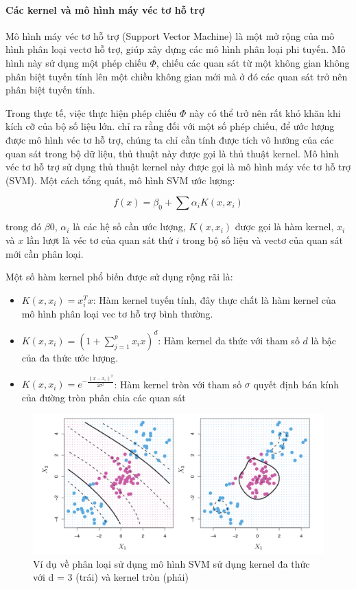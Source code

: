 \paragraph{Các kernel và mô hình máy véc tơ hỗ trợ}

Mô hình máy véc tơ hỗ trợ (Support Vector Machine) là một mở rộng của mô hình phân loại vectơ hỗ trợ, giúp xây dựng các mô hình phân loại phi tuyến. Mô hình này sử dụng một phép chiếu $\Phi$, chiếu các quan sát từ một không gian không phân biệt tuyến tính lên một chiều không gian mới mà ở đó các quan sát trở nên phân biệt tuyến tính.

Trong thực tế, việc thực hiện phép chiếu $\Phi$ này có thể trở nên rất khó khăn khi kích cỡ của bộ số liệu lớn. \textcite{scholkopf1999advances} chỉ ra rằng đối với một số phép chiếu, để ước lượng được mô hình véc tơ hỗ trợ, chúng ta chỉ cần tính được tích vô hướng của các quan sát trong bộ dữ liệu, thủ thuật này được gọi là thủ thuật kernel. Mô hình véc tơ hỗ trợ sử dụng thủ thuật kernel này được gọi là mô hình máy véc tơ hỗ trợ (SVM). Một cách tổng quát, mô hình SVM ước lượng:

$$
f(x) = \beta_0 + \sum\alpha_i K(x, x_i)
$$

trong đó $\beta0$, $\alpha_i$ là các hệ số cần ước lượng, $K(x, x_i)$ được gọi là hàm kernel, $x_i$ và $x$ lần lượt là véc tơ của quan sát thứ $i$ trong bộ số liệu và vectơ của quan sát mới cần phân loại.

Một số hàm kernel phổ biến được sử dụng rộng rãi là:

\begin{itemize}
  \item{$K(x, x_i) = x_i^T x$}: Hàm kernel tuyến tính, đây thực chất là hàm kernel của mô hình phân loại vec tơ hỗ trợ bình thường.
  \item{$K(x, x_i) =  (1 + \sum_{j = 1}^p x_i x)^d$}: Hàm kernel đa thức với tham số $d$ là bậc của đa thức ước lượng.
  \item{$K(x, x_i) = e^{-\frac{{\|x - x_i\|}^2}{2 \sigma^2}}$}: Hàm kernel tròn với tham số $\sigma$ quyết định bán kính của đường tròn phân chia các quan sát
\end{itemize}

\begin{figure}
  \centering
    \includegraphics[width=\textwidth]{./Figures/svm_kernel_example.png}
  \caption[Ví dụ về phân loại sử dụng mô hình SVM]{Ví dụ về phân loại sử dụng mô hình SVM sử dụng kernel đa thức với d = 3 (trái) và kernel tròn (phải)}
  \label{fig:svm_kernel_example}
\end{figure}

